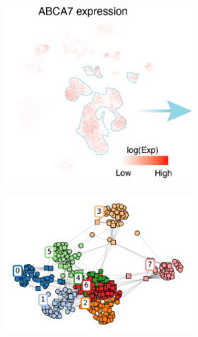 \begin{figure}[ht]
    \begin{subfigure}[t]{0.45\textwidth}
        \begin{subfigure}[t]{0.49\textwidth}
            \caption{}
            \includegraphics[width=\textwidth]{./main_plots/cell_projection_abca7_expression.png}        
        \end{subfigure}
        \begin{subfigure}[t]{0.49\textwidth}
            \caption{}
            \includegraphics[width=\textwidth]{./main_plots/kl__network.pdf}        

\end{subfigure}
\end{subfigure}
\end{figure}
